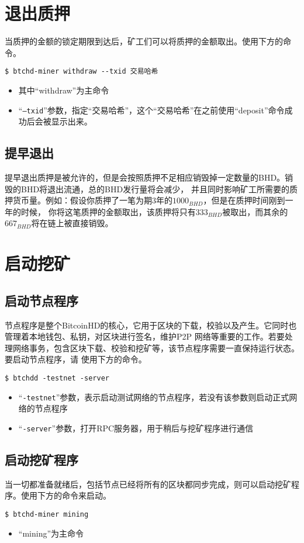 \section{退出质押}
\begin{flushleft}
    当质押的金额的锁定期限到达后，矿工们可以将质押的金额取出。使用下方的命令。
\end{flushleft}
\scriptsize
\begin{verbatim}
$ btchd-miner withdraw --txid 交易哈希
\end{verbatim}
\normalsize
\begin{itemize}
    \item 其中``withdraw''为主命令
    \item ``\texttt{--txid}''参数，指定``交易哈希''，这个``交易哈希''在之前使用``deposit''命令成功后会被显示出来。
\end{itemize}
\subsection{提早退出}
\begin{flushleft}
    提早退出质押是被允许的，但是会按照质押不足相应销毁掉一定数量的BHD。销毁的BHD将退出流通，总的BHD发行量将会减少，
    并且同时影响矿工所需要的质押货币量。例如：假设你质押了一笔为期3年的$1000_{BHD}$，但是在质押时间刚到一年的时候，
    你将这笔质押的金额取出，该质押将只有$333_{BHD}$被取出，而其余的$667_{BHD}$将在链上被直接销毁。
\end{flushleft}
\section{启动挖矿}
\subsection{启动节点程序}
\begin{flushleft}
    节点程序是整个BitcoinHD的核心，它用于区块的下载，校验以及产生。它同时也管理着本地钱包、私钥，对区块进行签名，维护P2P
    网络等重要的工作。若要处理网络事务，包含区块下载、校验和挖矿等，该节点程序需要一直保持运行状态。要启动节点程序，请
    使用下方的命令。
\end{flushleft}
\scriptsize
\begin{verbatim}
$ btchdd -testnet -server
\end{verbatim}
\normalsize
\begin{itemize}
    \item ``\texttt{-testnet}''参数，表示启动测试网络的节点程序，若没有该参数则启动正式网络的节点程序
    \item ``\texttt{-server}''参数，打开RPC服务器，用于稍后与挖矿程序进行通信
\end{itemize}
\subsection{启动挖矿程序}
\begin{flushleft}
    当一切都准备就绪后，包括节点已经将所有的区块都同步完成，则可以启动挖矿程序。使用下方的命令来启动。
\end{flushleft}
\scriptsize
\begin{verbatim}
$ btchd-miner mining
\end{verbatim}
\normalsize
\begin{itemize}
    \item ``mining''为主命令
\end{itemize}
